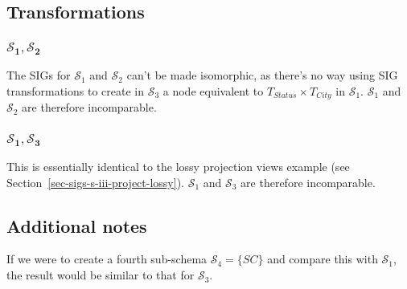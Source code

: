 \documentclass{article}
\newcommand{\identifier}[1]{\ensuremath{\mathit{#1}}}
\newcommand{\SC}{\identifier{SC}}
\newcommand{\Status}{\identifier{Status}}
\newcommand{\City}{\identifier{City}}
\newcommand{\Type}[1]{\ensuremath{T_{#1}}}
\newcommand{\schema}[1]{\ensuremath{\mathcal{S}_{#1}}}
\begin{document}




\subsection{Transformations}
\label{sec-transforming-join-one}




\subsubsection{\(\bm{\schema{1}, \schema{2}}\)}

\noindent The SIGs for \(\schema{1}\) and \(\schema{2}\) can't be made isomorphic, as there's no way using SIG transformations to create in \(\schema{3}\) a node equivalent to \(\Type{\Status} \times \Type{\City}\) in \(\schema{1}\). \(\schema{1}\) and \(\schema{2}\) are therefore incomparable.




\subsubsection{\(\bm{\schema{1}, \schema{3}}\)}

This is essentially identical to the lossy projection views example (see Section~\ref{sec-sigs-s-iii-project-lossy}). \(\schema{1}\) and \(\schema{3}\) are therefore incomparable.




\subsection{Additional notes}

If we were to create a fourth sub-schema \(\schema{4} = \{\SC\}\) and compare this with \(\schema{1}\), the result would be similar to that for \(\schema{3}\).


\end{document}
